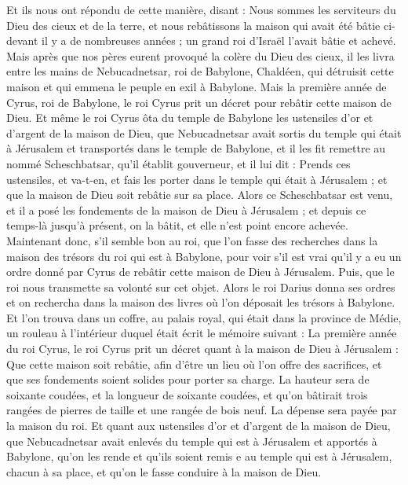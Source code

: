 \begin{multicols}{2}
Et ils nous ont répondu de cette manière, disant : Nous sommes les serviteurs du Dieu des cieux et de la terre, et nous rebâtissons la maison qui avait été bâtie ci-devant il y a de nombreuses années ; un grand roi d'Israël l’avait bâtie et achevé.
Mais après que nos pères eurent provoqué la colère du Dieu des cieux, il les livra entre les mains de Nebucadnetsar, roi de Babylone, Chaldéen, qui détruisit cette maison et qui emmena le peuple en exil à Babylone.
Mais la première année de Cyrus, roi de Babylone, le roi Cyrus prit un décret pour rebâtir cette maison de Dieu.
Et même le roi Cyrus ôta du temple de Babylone les ustensiles d'or et d'argent de la maison de Dieu, que Nebucadnetsar avait sortis du temple qui était à Jérusalem et transportés dans le temple de Babylone, et il les fit remettre au nommé Scheschbatsar, qu’il établit gouverneur,
et il lui dit : Prends ces ustensiles, et va-t-en, et fais les porter dans le temple qui était à Jérusalem ; et que la maison de Dieu soit rebâtie sur sa place.
Alors ce Scheschbatsar est venu, et il a posé les fondements de la maison de Dieu à Jérusalem ; et depuis ce temps-là jusqu'à présent, on la bâtit, et elle n'est point encore achevée.
Maintenant donc, s'il semble bon au roi, que l’on fasse des recherches dans la maison des trésors du roi qui est à Babylone, pour voir s'il est vrai qu'il y a eu un ordre donné par Cyrus de rebâtir cette  maison de Dieu à Jérusalem. Puis, que le roi nous transmette sa volonté sur cet objet.
\VerseOne{}Alors le roi Darius donna ses ordres et on rechercha dans la maison des livres où l'on déposait les  trésors à Babylone.
Et l’on trouva dans un coffre, au palais royal, qui était dans la province de Médie, un rouleau à l’intérieur duquel était écrit le mémoire suivant :
La première année du roi Cyrus, le roi Cyrus prit un décret quant à la maison de Dieu à Jérusalem : Que cette maison soit rebâtie, afin d’être un lieu où l'on offre des sacrifices, et que ses fondements soient solides pour porter sa charge. La hauteur sera de soixante coudées, et la longueur de soixante coudées,
et qu’on bâtirait trois rangées de pierres de taille et une rangée de bois neuf. La dépense sera payée par la maison du roi.
Et quant aux ustensiles d'or et d'argent de la maison de Dieu, que Nebucadnetsar avait enlevés du temple qui est à Jérusalem et apportés à Babylone, qu'on les rende et qu'ils soient remis e au temple qui est à Jérusalem, chacun à sa place, et qu'on le fasse conduire à la maison de Dieu.

\end{multicols}
